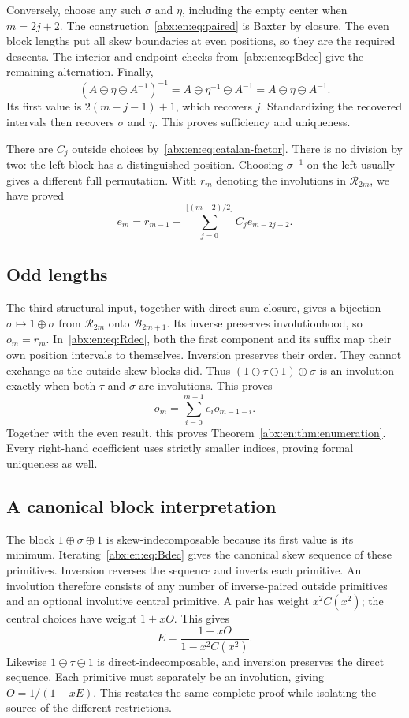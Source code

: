 \documentclass[11pt,letterpaper]{article}
\numberwithin{equation}{section}
\theoremstyle{remark}\newtheorem{remark}[theorem]{Remark}
\newcommand{\BB}{\mathcal B}
\newcommand{\RR}{\mathcal R}
\begin{document}
Conversely, choose any such $\sigma$ and $\eta$, including the empty
center when $m=2j+2$. The construction~\eqref{abx:en:eq:paired} is Baxter
by closure. The even block lengths put all skew boundaries at even
positions, so they are the required descents. The interior and endpoint
checks from~\eqref{abx:en:eq:Bdec} give the remaining alternation. Finally,
\[
 (A\ominus\eta\ominus A^{-1})^{-1}
   =A\ominus\eta^{-1}\ominus A^{-1}
   =A\ominus\eta\ominus A^{-1}.
\]
Its first value is $2(m-j-1)+1$, which recovers $j$. Standardizing
the recovered intervals then recovers $\sigma$ and $\eta$. This proves
sufficiency and uniqueness.

There are $C_j$ outside choices by~\eqref{abx:en:eq:catalan-factor}. There
is no division by two: the left block has a distinguished position.
Choosing $\sigma^{-1}$ on the left usually gives a different full
permutation. With $r_m$ denoting the involutions in $\RR_{2m}$,
we have proved
\[
 e_m=r_{m-1}+\sum_{j=0}^{\lfloor(m-2)/2\rfloor}C_j e_{m-2j-2}.
\]

\subsection{Odd lengths}\label{abx:en:sub:odd}
The third structural input, together with direct-sum closure, gives a
bijection $\sigma\mapsto1\oplus\sigma$ from $\RR_{2m}$ onto
$\BB_{2m+1}$. Its inverse preserves involutionhood, so $o_m=r_m$.
In~\eqref{abx:en:eq:Rdec}, both the first component and its suffix map their
own position intervals to themselves. Inversion preserves their order.
They cannot exchange as the outside skew blocks did. Thus
$(1\ominus\tau\ominus1)\oplus\sigma$ is an involution exactly
when both $\tau$ and $\sigma$ are involutions. This proves
\[
 o_m=\sum_{i=0}^{m-1}e_i o_{m-1-i}.
\]
Together with the even result, this proves
Theorem~\ref{abx:en:thm:enumeration}. Every right-hand coefficient uses
strictly smaller indices, proving formal uniqueness as well.

\subsection{A canonical block interpretation}\label{abx:en:sub:block}
The block $1\oplus\sigma\oplus1$ is skew-indecomposable because
its first value is its minimum. Iterating~\eqref{abx:en:eq:Bdec} gives the
canonical skew sequence of these primitives. Inversion reverses the
sequence and inverts each primitive. An involution therefore consists
of any number of inverse-paired outside primitives and an optional
involutive central primitive. A pair has weight $x^2C(x^2)$; the
central choices have weight $1+xO$. This gives
\[
 E=\frac{1+xO}{1-x^2C(x^2)}.
\]
Likewise $1\ominus\tau\ominus1$ is direct-indecomposable, and
inversion preserves the direct sequence. Each primitive must separately
be an involution, giving $O=1/(1-xE)$. This restates the same complete
proof while isolating the source of the different restrictions.
\end{document}
